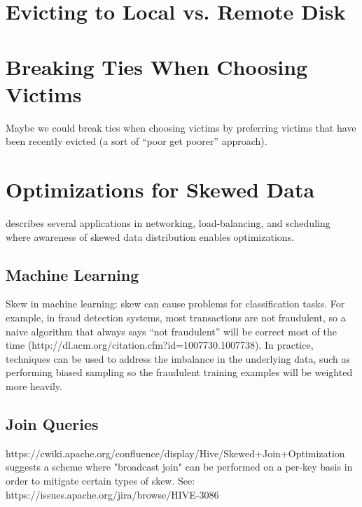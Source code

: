 \documentclass[12pt]{article}
\begin{document}

\section{Evicting to Local vs. Remote Disk}

\section{Breaking Ties When Choosing Victims}

Maybe we could break ties when choosing victims by preferring victims that have been recently evicted (a sort of ``poor get poorer'' approach).


\section{Optimizations for Skewed Data}

\cite{perf-eval-heavy-tail} describes several applications in networking, load-balancing, and scheduling where awareness of skewed data distribution enables optimizations.

\subsection{Machine Learning}

Skew in machine learning: skew can cause problems for classification tasks.
For example, in fraud detection systems, most transactions are not
fraudulent, so a naive algorithm that always says ``not fraudulent'' will be
correct most of the time
(http://dl.acm.org/citation.cfm?id=1007730.1007738).  In practice,
techniques can be used to address the imbalance in the underlying data, such
as performing biased sampling so the fraudulent training examples will be
weighted more heavily.

\subsection{Join Queries}

https://cwiki.apache.org/confluence/display/Hive/Skewed+Join+Optimization
suggests a scheme where "broadcast join" can be performed on a per-key basis
in order to mitigate certain types of skew.  See:
https://issues.apache.org/jira/browse/HIVE-3086
\end{document}
